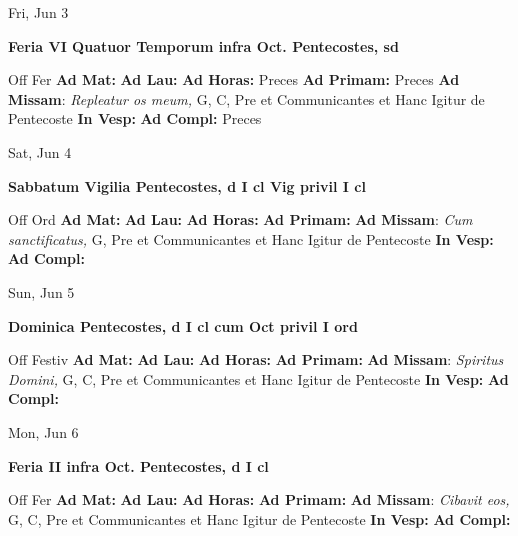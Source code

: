 \documentclass[10pt]{article}
\begin{document}
\begin{minipage}{3.5in}
\vspace{2em}\begin{center}
Fri, Jun 3
\end{center}\textbf{ \large Feria VI Quatuor Temporum infra Oct. Pentecostes, \textnormal{\normalsize sd}}
\begin{justify}
Off Fer
\textbf{Ad Mat: }
\textbf{Ad Lau: }
\textbf{Ad Horas: }Preces
\textbf{Ad Primam: }Preces
\textbf{Ad Missam}: \textit{Repleatur os meum,} G, C, Pre et Communicantes et Hanc Igitur de Pentecoste
\textbf{In Vesp: }
\textbf{Ad Compl: }Preces\end{justify}
\end{minipage}



\begin{minipage}{3.5in}
\vspace{2em}\begin{center}
Sat, Jun 4
\end{center}\textbf{ \large Sabbatum Vigilia Pentecostes, \textnormal{\normalsize d I cl Vig privil I cl}}
\begin{justify}
Off Ord
\textbf{Ad Mat: }
\textbf{Ad Lau: }
\textbf{Ad Horas: }
\textbf{Ad Primam: }
\textbf{Ad Missam}: \textit{Cum sanctificatus,} G, Pre et Communicantes et Hanc Igitur de Pentecoste
\textbf{In Vesp: }
\textbf{Ad Compl: }\end{justify}
\end{minipage}



\begin{minipage}{3.5in}
\vspace{2em}\begin{center}
Sun, Jun 5
\end{center}\textbf{ \large Dominica Pentecostes, \textnormal{\normalsize d I cl cum Oct privil I ord}}
\begin{justify}
Off Festiv
\textbf{Ad Mat: }
\textbf{Ad Lau: }
\textbf{Ad Horas: }
\textbf{Ad Primam: }
\textbf{Ad Missam}: \textit{Spiritus Domini,} G, C, Pre et Communicantes et Hanc Igitur de Pentecoste
\textbf{In Vesp: }
\textbf{Ad Compl: }\end{justify}
\end{minipage}



\begin{minipage}{3.5in}
\vspace{2em}\begin{center}
Mon, Jun 6
\end{center}\textbf{ \large Feria II infra Oct. Pentecostes, \textnormal{\normalsize d I cl}}
\begin{justify}
Off Fer
\textbf{Ad Mat: }
\textbf{Ad Lau: }
\textbf{Ad Horas: }
\textbf{Ad Primam: }
\textbf{Ad Missam}: \textit{Cibavit eos,} G, C, Pre et Communicantes et Hanc Igitur de Pentecoste
\textbf{In Vesp: }
\textbf{Ad Compl: }\end{justify}
\end{minipage}
\end{document}
